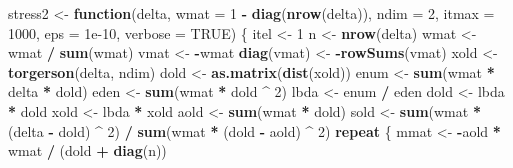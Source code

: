 \documentclass[
  12pt,
]{article}
\newenvironment{Shaded}{\begin{snugshade}}{\end{snugshade}}
\newcommand{\AttributeTok}[1]{\textcolor[rgb]{0.13,0.29,0.53}{#1}}
\newcommand{\ConstantTok}[1]{\textcolor[rgb]{0.56,0.35,0.01}{#1}}
\newcommand{\ControlFlowTok}[1]{\textcolor[rgb]{0.13,0.29,0.53}{\textbf{#1}}}
\newcommand{\DecValTok}[1]{\textcolor[rgb]{0.00,0.00,0.81}{#1}}
\newcommand{\FloatTok}[1]{\textcolor[rgb]{0.00,0.00,0.81}{#1}}
\newcommand{\FunctionTok}[1]{\textcolor[rgb]{0.13,0.29,0.53}{\textbf{#1}}}
\newcommand{\NormalTok}[1]{#1}
\newcommand{\OtherTok}[1]{\textcolor[rgb]{0.56,0.35,0.01}{#1}}
\newcommand{\SpecialCharTok}[1]{\textcolor[rgb]{0.81,0.36,0.00}{\textbf{#1}}}
\theoremstyle{definition}
\theoremstyle{definition}
\theoremstyle{definition}
\theoremstyle{definition}
\theoremstyle{remark}
\begin{document}
\begin{Shaded}
\begin{Highlighting}[]
\NormalTok{stress2 }\OtherTok{\textless{}{-}}
  \ControlFlowTok{function}\NormalTok{(delta,}
           \AttributeTok{wmat =} \DecValTok{1} \SpecialCharTok{{-}} \FunctionTok{diag}\NormalTok{(}\FunctionTok{nrow}\NormalTok{(delta)),}
           \AttributeTok{ndim =} \DecValTok{2}\NormalTok{,}
           \AttributeTok{itmax =} \DecValTok{1000}\NormalTok{,}
           \AttributeTok{eps =} \FloatTok{1e{-}10}\NormalTok{,}
           \AttributeTok{verbose =} \ConstantTok{TRUE}\NormalTok{) \{}
\NormalTok{    itel }\OtherTok{\textless{}{-}} \DecValTok{1}
\NormalTok{    n }\OtherTok{\textless{}{-}} \FunctionTok{nrow}\NormalTok{(delta)}
\NormalTok{    wmat }\OtherTok{\textless{}{-}}\NormalTok{ wmat }\SpecialCharTok{/} \FunctionTok{sum}\NormalTok{(wmat)}
\NormalTok{    vmat }\OtherTok{\textless{}{-}} \SpecialCharTok{{-}}\NormalTok{wmat}
    \FunctionTok{diag}\NormalTok{(vmat) }\OtherTok{\textless{}{-}} \SpecialCharTok{{-}}\FunctionTok{rowSums}\NormalTok{(vmat)}
\NormalTok{    xold }\OtherTok{\textless{}{-}} \FunctionTok{torgerson}\NormalTok{(delta, ndim)}
\NormalTok{    dold }\OtherTok{\textless{}{-}} \FunctionTok{as.matrix}\NormalTok{(}\FunctionTok{dist}\NormalTok{(xold))}
\NormalTok{    enum }\OtherTok{\textless{}{-}} \FunctionTok{sum}\NormalTok{(wmat }\SpecialCharTok{*}\NormalTok{ delta }\SpecialCharTok{*}\NormalTok{ dold)}
\NormalTok{    eden }\OtherTok{\textless{}{-}} \FunctionTok{sum}\NormalTok{(wmat }\SpecialCharTok{*}\NormalTok{ dold }\SpecialCharTok{\^{}} \DecValTok{2}\NormalTok{)}
\NormalTok{    lbda }\OtherTok{\textless{}{-}}\NormalTok{ enum }\SpecialCharTok{/}\NormalTok{ eden}
\NormalTok{    dold }\OtherTok{\textless{}{-}}\NormalTok{ lbda }\SpecialCharTok{*}\NormalTok{ dold}
\NormalTok{    xold }\OtherTok{\textless{}{-}}\NormalTok{ lbda }\SpecialCharTok{*}\NormalTok{ xold}
\NormalTok{    aold }\OtherTok{\textless{}{-}} \FunctionTok{sum}\NormalTok{(wmat }\SpecialCharTok{*}\NormalTok{ dold)}
\NormalTok{    sold }\OtherTok{\textless{}{-}} \FunctionTok{sum}\NormalTok{(wmat }\SpecialCharTok{*}\NormalTok{ (delta }\SpecialCharTok{{-}}\NormalTok{ dold) }\SpecialCharTok{\^{}} \DecValTok{2}\NormalTok{) }\SpecialCharTok{/} \FunctionTok{sum}\NormalTok{(wmat }\SpecialCharTok{*}\NormalTok{ (dold }\SpecialCharTok{{-}}\NormalTok{ aold) }\SpecialCharTok{\^{}} \DecValTok{2}\NormalTok{)}
    \ControlFlowTok{repeat}\NormalTok{ \{}
\NormalTok{      mmat }\OtherTok{\textless{}{-}} \SpecialCharTok{{-}}\NormalTok{aold }\SpecialCharTok{*}\NormalTok{ wmat }\SpecialCharTok{/}\NormalTok{ (dold }\SpecialCharTok{+} \FunctionTok{diag}\NormalTok{(n))}

\end{Highlighting}
\end{Shaded}
\end{document}
